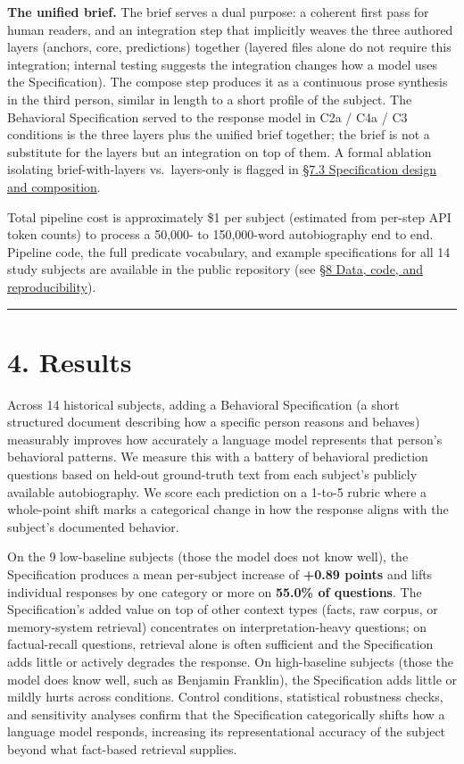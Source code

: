 \textbf{The unified brief.} The brief serves a dual purpose: a coherent
first pass for human readers, and an integration step that implicitly
weaves the three authored layers (anchors, core, predictions) together
(layered files alone do not require this integration; internal testing
suggests the integration changes how a model uses the Specification).
The compose step produces it as a continuous prose synthesis in the
third person, similar in length to a short profile of the subject. The
Behavioral Specification served to the response model in C2a / C4a / C3
conditions is the three layers plus the unified brief together; the
brief is not a substitute for the layers but an integration on top of
them. A formal ablation isolating brief-with-layers vs.~layers-only is
flagged in
\protect\hyperlink{specification-design-and-composition}{§7.3
Specification design and composition}.

Total pipeline cost is approximately \$1 per subject (estimated from
per-step API token counts) to process a 50,000- to 150,000-word
autobiography end to end. Pipeline code, the full predicate vocabulary,
and example specifications for all 14 study subjects are available in
the public repository (see
\protect\hyperlink{data-code-and-reproducibility}{§8 Data, code, and
reproducibility}).

\begin{center}\rule{0.5\linewidth}{0.5pt}\end{center}

\hypertarget{results}{%
\section{4. Results}\label{results}}

Across 14 historical subjects, adding a Behavioral Specification (a
short structured document describing how a specific person reasons and
behaves) measurably improves how accurately a language model represents
that person's behavioral patterns. We measure this with a battery of
behavioral prediction questions based on held-out ground-truth text from
each subject's publicly available autobiography. We score each
prediction on a 1-to-5 rubric where a whole-point shift marks a
categorical change in how the response aligns with the subject's
documented behavior.

On the 9 low-baseline subjects (those the model does not know well), the
Specification produces a mean per-subject increase of \textbf{+0.89
points} and lifts individual responses by one category or more on
\textbf{55.0\% of questions}. The Specification's added value on top of
other context types (facts, raw corpus, or memory-system retrieval)
concentrates on interpretation-heavy questions; on factual-recall
questions, retrieval alone is often sufficient and the Specification
adds little or actively degrades the response. On high-baseline subjects
(those the model does know well, such as Benjamin Franklin), the
Specification adds little or mildly hurts across conditions. Control
conditions, statistical robustness checks, and sensitivity analyses
confirm that the Specification categorically shifts how a language model
responds, increasing its representational accuracy of the subject beyond
what fact-based retrieval supplies.

